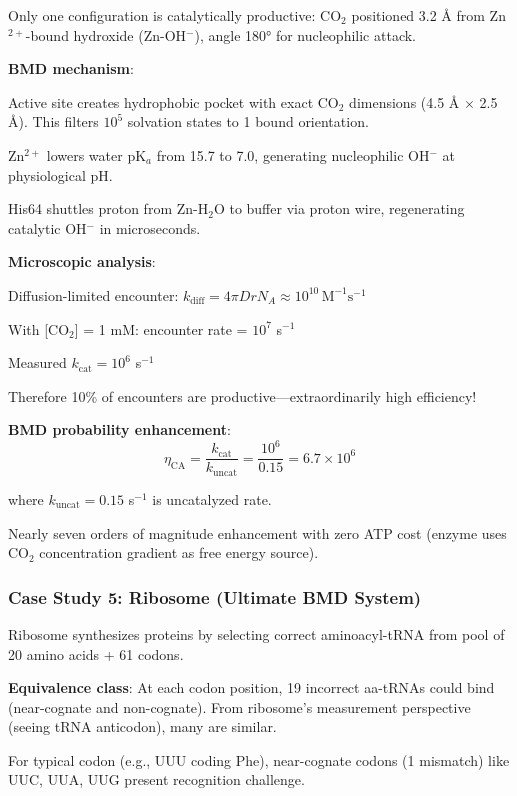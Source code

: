 \documentclass[11pt,onecolumn]{article}
\begin{document}
Only one configuration is catalytically productive: CO$_2$ positioned 3.2 Å from Zn$^{2+}$-bound hydroxide (Zn-OH$^-$), angle 180° for nucleophilic attack.

\textbf{BMD mechanism}:

Active site creates hydrophobic pocket with exact CO$_2$ dimensions (4.5 Å $\times$ 2.5 Å). This filters $10^5$ solvation states to 1 bound orientation.

Zn$^{2+}$ lowers water pK$_a$ from 15.7 to 7.0, generating nucleophilic OH$^-$ at physiological pH.

His64 shuttles proton from Zn-H$_2$O to buffer via proton wire, regenerating catalytic OH$^-$ in microseconds.

\textbf{Microscopic analysis}:

Diffusion-limited encounter: $k_{\text{diff}} = 4\pi D r N_A \approx 10^{10}\,\text{M}^{-1}\text{s}^{-1}$

With [CO$_2$] = 1 mM: encounter rate = $10^7$ s$^{-1}$

Measured $k_{\text{cat}} = 10^6$ s$^{-1}$

Therefore 10\% of encounters are productive---extraordinarily high efficiency!

\textbf{BMD probability enhancement}:
\begin{equation}
\eta_{\text{CA}} = \frac{k_{\text{cat}}}{k_{\text{uncat}}} = \frac{10^6}{0.15} = 6.7 \times 10^6
\end{equation}

where $k_{\text{uncat}} = 0.15$ s$^{-1}$ is uncatalyzed rate.

Nearly seven orders of magnitude enhancement with zero ATP cost (enzyme uses CO$_2$ concentration gradient as free energy source).

\subsubsection{Case Study 5: Ribosome (Ultimate BMD System)}

Ribosome synthesizes proteins by selecting correct aminoacyl-tRNA from pool of 20 amino acids + 61 codons.

\textbf{Equivalence class}: At each codon position, 19 incorrect aa-tRNAs could bind (near-cognate and non-cognate). From ribosome's measurement perspective (seeing tRNA anticodon), many are similar.

For typical codon (e.g., UUU coding Phe), near-cognate codons (1 mismatch) like UUC, UUA, UUG present recognition challenge.
\end{document}
